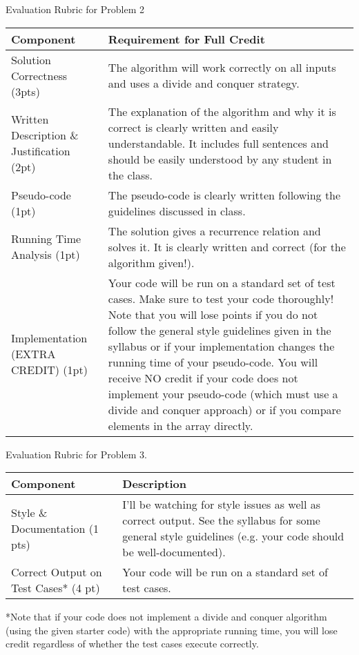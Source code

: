 \documentclass[11pt,answers]{exam}
\begin{document}
Evaluation Rubric for Problem 2\\
\begin{center}
  \begin{tabular}{| p{7cm} | p{10cm} |}
	\hline
	Component & Requirement for Full Credit\\
    \hline
    Solution Correctness  (3pts) & The algorithm will work correctly on all inputs and uses a divide and conquer strategy.  \\ \hline
  Written Description \& Justification (2pt) & The explanation of the algorithm and why it is correct is clearly written and easily understandable.  It includes full sentences and should be easily understood by any student in the class. \\ \hline
	Pseudo-code  (1pt) & The pseudo-code is clearly written following the guidelines discussed in class.\\ \hline
	Running Time Analysis  (1pt) & The solution gives a recurrence relation and solves it.  It is clearly written and correct (for the algorithm given!).  \\ \hline
	Implementation (EXTRA CREDIT)  (1pt) & Your code will be run on a standard set of test cases.  Make sure to test your code thoroughly!  Note that you will lose points if you do not follow the general style guidelines given in the syllabus or if your implementation changes the running time of your pseudo-code.  You will receive NO credit if your code does not implement your pseudo-code (which must use a divide and conquer approach) or if you compare elements in the array directly.  \\ \hline

  \end{tabular}
\end{center}

Evaluation Rubric for Problem 3.
\begin{center}
  \begin{tabular}{| p{7cm} | p{10cm} |}
	\hline
	Component & Description 	\\
    \hline
    Style \& Documentation  (1 pts) & I'll be watching for style issues as well as correct output.  See the syllabus for some general style guidelines (e.g. your code should be well-documented).  
		\\ \hline
 Correct Output on Test Cases* (4 pt) & Your code will be run on a standard set of test cases. \\ \hline
  \end{tabular}
\end{center}
*Note that if your code does not implement a divide and conquer algorithm (using the given starter code) with the appropriate running time, you will lose credit regardless of whether the test cases execute correctly.\\
\end{document}
